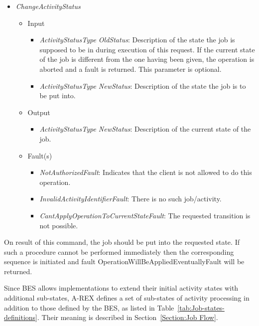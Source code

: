 \documentclass{article}                            %
\begin{document}
\begin{itemize}
\item \emph{ChangeActivityStatus}
\begin{itemize}
\item Input
\begin{itemize}
\item \emph{ActivityStatusType OldStatus}: Description of the state the
job is supposed to be in during execution of this request. If the
current state of the job is different from the one having been given,
the operation is aborted and a fault is returned. This parameter is
optional.
\item \emph{ActivityStatusType NewStatus}: Description of the state the
job is to be put into.
\end{itemize}
\item Output
\begin{itemize}
\item \emph{ActivityStatusType NewStatus}: Description of the current state
of the job.
\end{itemize}
\item Fault(s)
\begin{itemize}
\item \emph{NotAuthorizedFault}: Indicates that the client is not allowed
to do this operation.
\item \emph{InvalidActivityIdentifierFault}: There is no such job/activity.
\item \emph{CantApplyOperationToCurrentStateFault}: The requested transition
is not possible.
\end{itemize}
\end{itemize}
\end{itemize}

On result of this command, the job should be put into the requested
state. If such a procedure cannot be performed immediately then the
corresponding sequence is initiated and fault OperationWillBeAppliedEventuallyFault
will be returned.

Since BES allows implementations to extend their initial activity
states with additional sub-states, A-REX defines a set of sub-states
of activity processing in addition to those defined by the BES, as
listed in Table~\ref{tab:Job-states-definitions}. Their meaning is
described in Section~\ref{Section:Job Flow}.
\end{document}
